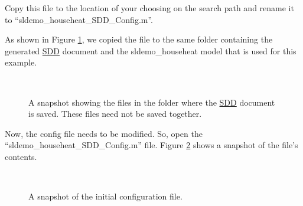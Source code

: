 \documentclass{mcscert}
\begin{document}
Copy this file to the location of your choosing on the search path and rename it to 
``sldemo\_househeat\_SDD\_Config.m''. 

As shown in Figure \ref{fig:folder-with-model-1}, we copied the file to the same folder containing the generated \hyperref[acr:sdd]{SDD} document and the sldemo\_househeat model that is used for this example.

\begin{figure}
	\caption{A snapshot showing the files in the folder where the \hyperref[acr:sdd]{SDD} document is saved. 
	These files need not be saved together.}
	\centering
	\label{fig:folder-with-model-1}
	\\
\end{figure}

\newpage
Now, the config file needs to be modified. 
So, open the \\
``sldemo\_househeat\_SDD\_Config.m'' file. 
Figure \ref{fig:config-1} shows a snapshot of the file's contents.

\begin{figure}
	\caption{A snapshot of the initial configuration file.}
	\centering
	\label{fig:config-1}
	\\
\end{figure}
\end{document}

